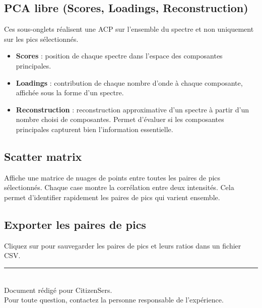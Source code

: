 \documentclass[12pt, a4paper]{article}
\newcommand{\bouton}[1]{%
  \tikz[baseline=(b.base)]{%
    \node[rounded corners=3pt, fill=darkgray!12, draw=darkgray!35,
          inner xsep=5pt, inner ysep=2pt,
          font=\small\bfseries\color{darkgray}] (b) {#1};}%
}
\begin{document}
\subsection{PCA libre (Scores, Loadings, Reconstruction)}

Ces sous-onglets réalisent une ACP sur l'ensemble du spectre et non
uniquement sur les pics sélectionnés.

\begin{itemize}
  \item \textbf{Scores} : position de chaque spectre dans l'espace
        des composantes principales.
  \item \textbf{Loadings} : contribution de chaque nombre d'onde à
        chaque composante, affichée sous la forme d'un spectre.
  \item \textbf{Reconstruction} : reconstruction approximative d'un
        spectre à partir d'un nombre choisi de composantes.
        Permet d'évaluer si les composantes principales capturent
        bien l'information essentielle.
\end{itemize}

\subsection{Scatter matrix}

Affiche une matrice de nuages de points entre toutes les paires de
pics sélectionnés.
Chaque case montre la corrélation entre deux intensités.
Cela permet d'identifier rapidement les paires de pics qui varient
ensemble.

\subsection{Exporter les paires de pics}

Cliquez sur \bouton{Exporter tableau CSV} pour sauvegarder les paires
de pics et leurs ratios dans un fichier CSV.

\vfill
\begin{center}
  \color{rulecolor}\rule{8cm}{0.4pt}\\[6pt]
  \small\color{darkgray}
  Document rédigé pour CitizenSers.\\
  Pour toute question, contactez la personne responsable de
  l'expérience.
\end{center}
\end{document}
